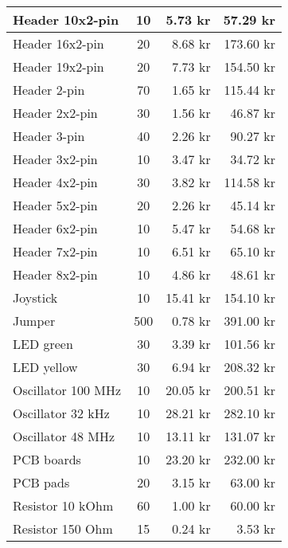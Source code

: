 \begin{longtable}{|l|c|r|r|}
    Header 10x2-pin         & 10     & 5.73 kr    & 57.29 kr    \\ \hline
    Header 16x2-pin         & 20     & 8.68 kr    & 173.60 kr   \\ \hline
    Header 19x2-pin         & 20     & 7.73 kr    & 154.50 kr   \\ \hline
    Header 2-pin            & 70     & 1.65 kr    & 115.44 kr   \\ \hline
    Header 2x2-pin          & 30     & 1.56 kr    & 46.87 kr    \\ \hline
    Header 3-pin            & 40     & 2.26 kr    & 90.27 kr    \\ \hline
    Header 3x2-pin          & 10     & 3.47 kr    & 34.72 kr    \\ \hline
    Header 4x2-pin          & 30     & 3.82 kr    & 114.58 kr   \\ \hline
    Header 5x2-pin          & 20     & 2.26 kr    & 45.14 kr    \\ \hline
    Header 6x2-pin          & 10     & 5.47 kr    & 54.68 kr    \\ \hline
    Header 7x2-pin          & 10     & 6.51 kr    & 65.10 kr    \\ \hline
    Header 8x2-pin          & 10     & 4.86 kr    & 48.61 kr    \\ \hline
    Joystick                & 10     & 15.41 kr   & 154.10 kr   \\ \hline
    Jumper                  & 500    & 0.78 kr    & 391.00 kr   \\ \hline
    LED green               & 30     & 3.39 kr    & 101.56 kr   \\ \hline
    LED yellow              & 30     & 6.94 kr    & 208.32 kr   \\ \hline
    Oscillator 100 MHz      & 10     & 20.05 kr   & 200.51 kr   \\ \hline
    Oscillator 32 kHz       & 10     & 28.21 kr   & 282.10 kr   \\ \hline
    Oscillator 48 MHz       & 10     & 13.11 kr   & 131.07 kr   \\ \hline
    PCB boards              & 10     & 23.20 kr   & 232.00 kr   \\ \hline
    PCB pads                & 20     & 3.15 kr    & 63.00 kr    \\ \hline
    Resistor 10 kOhm        & 60     & 1.00 kr    & 60.00 kr    \\ \hline
    Resistor 150 Ohm        & 15     & 0.24 kr    & 3.53 kr     \\ \hline

\end{longtable}
